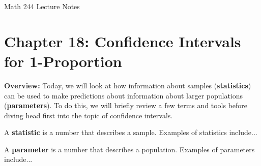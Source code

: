 \documentclass[12pt]{amsart}
\date{}
\theoremstyle{definition}
\begin{document}
\newcommand{\ph}{\phantom}
\newcommand{\ds}{\displaystyle}

\renewcommand{\emph}{\textbf}
\onehalfspace


\fancyhf{}   %
\renewcommand{\headrulewidth}{0.4pt} %
\fancyfootoffset[LE,LO]{0in}        %
\renewcommand{\footrulewidth}{0.4pt} %




\begin{center}

	\larger[3]	Math 244 Lecture Notes \smaller[3]		\\[22pt]

\end{center}

\section*{Chapter 18: Confidence Intervals for 1-Proportion}




 \textbf{Overview:} Today, we will look at how information about samples (\emph{statistics}) can be used to make predictions about information about larger populations (\emph{parameters}). To do this, we will briefly review a few terms and tools before diving head first into the topic of confidence intervals.
 \begin{framed}
 A \emph{statistic} is a number that describes a sample. Examples of statistics include... \vspace{0.2in}
 \end{framed}
 
 \begin{framed}
 	A \emph{parameter} is a number that describes a population. Examples of parameters include... \vspace{0.2in}
 \end{framed}
\end{document}
